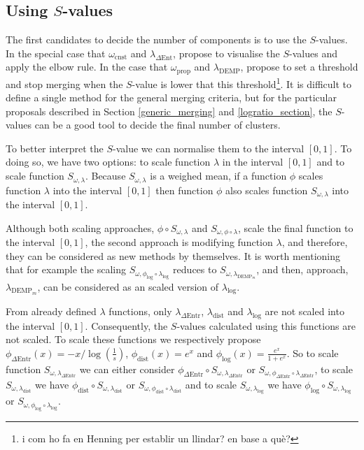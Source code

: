 \documentclass[submit]{smj}
\theoremstyle{definition}
\begin{document}
\subsection{Using $S$-values}

The first candidates to decide the number of components is to use the $S$-values. In the special case that $\omega_{\text{cnst}}$ and $\lambda_{\Delta\text{Ent}}$, \cite{baudry2010combining} propose to visualise the $S$-values and apply the elbow rule. In the case that $\omega_{\text{prop}}$ and $\lambda_{\text{DEMP}}$, \cite{hennig2010methods} propose to set a threshold and stop merging when the $S$-value is lower that this threshold\footnote{i com ho fa en Henning per establir un llindar? en base a què?}. It is difficult to define a single method for the general merging criteria, but for the particular proposals described in Section \ref{generic_merging} and \ref{logratio_section}, the $S$-values can be a good tool to decide the final number of clusters.

To better interpret the $S$-value we can normalise them to the interval $\left[0,1\right]$. To doing so, we have two options: to scale function $\lambda$ in the interval $\left[0,1\right]$ and to scale function $S_{\omega, \lambda}$. Because $S_{\omega, \lambda}$ is a weighed mean, if a function $\phi$ scales function $\lambda$ into the interval $\left[0,1\right]$ then function $\phi$ also scales function $S_{\omega, \lambda}$ into the interval $\left[0,1\right]$.

Although both scaling approaches, $\phi \circ S_{\omega, \lambda}$ and $S_{\omega, \phi \circ \lambda}$, scale the final function to the interval $\left[0,1\right]$, the second approach is modifying function $\lambda$, and therefore, they can be considered as new methods by themselves. It is worth mentioning that for example the scaling $S_{\omega, \phi_{\log} \circ \lambda_{\log}}$ reduces to $S_{\omega, \lambda_{\text{DEMP}_m}}$, and then, \cite{longford2014} approach, $\lambda_{\text{DEMP}_m}$, can be considered as an scaled version of $\lambda_{\log}$.

From already defined $\lambda$ functions, only $\lambda_{\Delta\text{Entr}}$, $\lambda_{\text{dist}}$ and 
$\lambda_{\log}$ are not scaled into the interval $\left[0,1\right]$. Consequently, the $S$-values calculated using this functions are not scaled. To scale these functions we respectively propose  $\phi_{\Delta\text{Entr}}(x) = -x/{\log(\frac{1}{s})}$, $\phi_{\text{dist}}(x) = e^x$ and $\phi_{\log}(x) = \frac{e^x}{1+e^x}$. So 
to scale function $S_{\omega, \lambda_{\Delta\text{Entr}}}$ we can either consider $\phi_{\Delta\text{Entr}} \circ S_{\omega, \lambda_{\Delta\text{Entr}}}$ or $S_{\omega, \phi_{\Delta\text{Entr}} \circ \lambda_{\Delta\text{Entr}}}$, to scale $S_{\omega, \lambda_{\text{dist}}}$ we have $\phi_{\text{dist}} \circ S_{\omega, \lambda_{\text{dist}}}$ or $S_{\omega, \phi_{\text{dist}} \circ \lambda_{\text{dist}}}$ and to scale $S_{\omega, \lambda_{\log}}$ we have $\phi_{\log} \circ S_{\omega, \lambda_{\log}}$ or $S_{\omega, \phi_{\log} \circ \lambda_{\log}}$.
\end{document}
